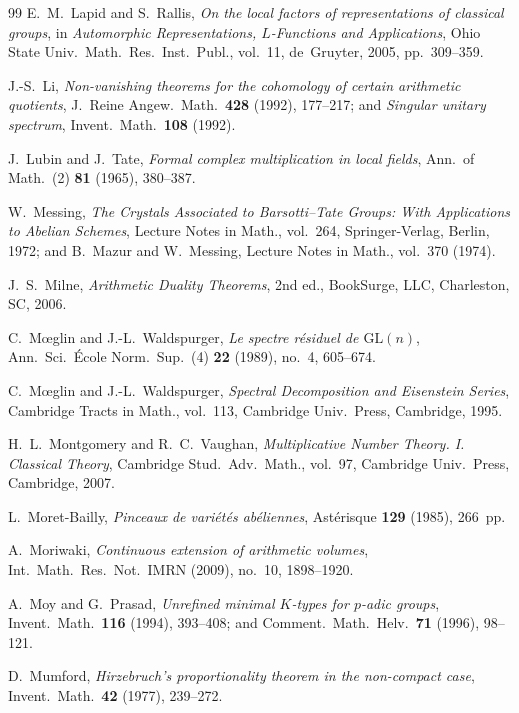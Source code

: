 \begin{thebibliography}{99}
E.~M.~Lapid and S.~Rallis,
\emph{On the local factors of representations of classical groups},
in \emph{Automorphic Representations, $L$-Functions and Applications}, Ohio State Univ.\ Math.\ Res.\ Inst.\ Publ., vol.~11, de~Gruyter, 2005, pp.~309--359.

J.-S.~Li,
\emph{Non-vanishing theorems for the cohomology of certain arithmetic quotients},
J.\ Reine Angew.\ Math.\ \textbf{428} (1992), 177--217; and \emph{Singular unitary spectrum}, Invent.\ Math.\ \textbf{108} (1992).

J.~Lubin and J.~Tate,
\emph{Formal complex multiplication in local fields},
Ann.\ of Math.\ (2) \textbf{81} (1965), 380--387.

W.~Messing,
\emph{The Crystals Associated to Barsotti--Tate Groups: With Applications to Abelian Schemes},
Lecture Notes in Math., vol.~264, Springer-Verlag, Berlin, 1972; and B.~Mazur and W.~Messing, Lecture Notes in Math., vol.~370 (1974).

J.~S.~Milne,
\emph{Arithmetic Duality Theorems},
2nd ed., BookSurge, LLC, Charleston, SC, 2006.

C.~M\oe glin and J.-L.~Waldspurger,
\emph{Le spectre r\'esiduel de $\mathrm{GL}(n)$},
Ann.\ Sci.\ \'Ecole Norm.\ Sup.\ (4) \textbf{22} (1989), no.~4, 605--674.

C.~M\oe glin and J.-L.~Waldspurger,
\emph{Spectral Decomposition and Eisenstein Series},
Cambridge Tracts in Math., vol.~113, Cambridge Univ.\ Press, Cambridge, 1995.

H.~L.~Montgomery and R.~C.~Vaughan,
\emph{Multiplicative Number Theory. I. Classical Theory},
Cambridge Stud.\ Adv.\ Math., vol.~97, Cambridge Univ.\ Press, Cambridge, 2007.

L.~Moret-Bailly,
\emph{Pinceaux de vari\'et\'es ab\'eliennes},
Ast\'erisque \textbf{129} (1985), 266~pp.

A.~Moriwaki,
\emph{Continuous extension of arithmetic volumes},
Int.\ Math.\ Res.\ Not.\ IMRN (2009), no.~10, 1898--1920.

A.~Moy and G.~Prasad,
\emph{Unrefined minimal $K$-types for $p$-adic groups},
Invent.\ Math.\ \textbf{116} (1994), 393--408; and Comment.\ Math.\ Helv.\ \textbf{71} (1996), 98--121.

D.~Mumford,
\emph{Hirzebruch's proportionality theorem in the non-compact case},
Invent.\ Math.\ \textbf{42} (1977), 239--272.


\end{thebibliography}

